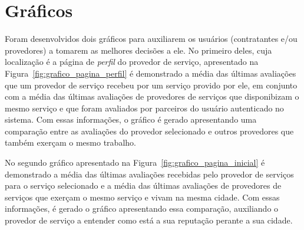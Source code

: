 \section{Gráficos}

Foram desenvolvidos dois gráficos para auxiliarem os usuários (contratantes e/ou provedores) a tomarem as melhores decisões a ele. No primeiro deles, cuja localização é a página de \textit{perfil} do provedor de serviço, apresentado na Figura~\ref{fig:grafico_pagina_perfil} é demonstrado a média das últimas avaliações que um provedor de serviço recebeu por um serviço provido por ele, em conjunto com a média das últimas avaliações de provedores de serviços que disponibizam o mesmo serviço e que foram avaliados por parceiros do usuário autenticado no sistema. Com essas informações, o gráfico é gerado apresentando uma comparação entre as avaliações do provedor selecionado e outros provedores que também exerçam o mesmo trabalho.

No segundo gráfico apresentado na Figura~\ref{fig:grafico_pagina_inicial} é demonstrado a média das últimas avaliações recebidas pelo provedor de serviços para o serviço selecionado e a média das últimas avaliações de provedores de serviços que exerçam o mesmo serviço e vivam na mesma cidade. Com essas informações, é gerado o gráfico apresentando essa comparação, auxiliando o provedor de serviço a entender como está a sua reputação perante a sua cidade.	

